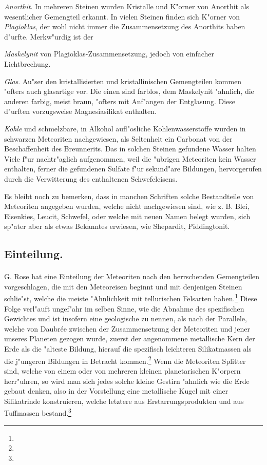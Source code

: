 \documentclass[a4paper, 11pt, oneside, polutonikogreek, german]{article}
\begin{document}
\emph{Anorthit}. In mehreren Steinen wurden Kristalle und K"orner von Anorthit als wesentlicher Gemengteil erkannt. In vielen Steinen finden sich K"orner von \emph{Plagioklas}, der wohl nicht immer die Zusammensetzung des Anorthits haben d"urfte. Merkw"urdig ist der

\emph{Maskelynit} von Plagioklas-Zusammensetzung, jedoch von einfacher Lichtbrechung.

\emph{Glas}. Au"ser den kristallisierten und kristallinischen Gemengteilen kommen "ofters auch glasartige vor. Die einen sind farblos, dem Maskelynit "ahnlich, die anderen farbig, meist braun, "ofters mit Anf"angen der Entglasung. Diese d"urften vorzugsweise Magnesiasilikat enthalten.

\emph{Kohle} und schmelzbare, in Alkohol aufl"osliche Kohlenwasserstoffe wurden in schwarzen Meteoriten nachgewiesen, als Seltenheit ein Carbonat von der Beschaffenheit des Breunnerits. Das in solchen Steinen gefundene Wasser halten Viele f"ur nachtr"aglich aufgenommen, weil die "ubrigen Meteoriten kein Wasser enthalten, ferner die gefundenen Sulfate f"ur sekund"are Bildungen, hervorgerufen durch die Verwitterung des enthaltenen Schwefeleisens.

Es bleibt noch zu bemerken, dass in manchen Schriften solche Bestandteile von Meteoriten angegeben wurden, welche nicht nachgewiesen sind, wie z. B. Blei, Eisenkies, Leucit, Schwefel, oder welche mit neuen Namen belegt wurden, sich sp"ater aber als etwas Bekanntes erwiesen, wie Shepardit, Piddingtonit.

\subsection{Einteilung.}
\paragraph*{}
G. Rose hat eine Einteilung der Meteoriten nach den herrschenden Gemengteilen vorgeschlagen, die mit den Meteoreisen beginnt und mit denjenigen Steinen schlie"st, welche die meiste "Ahnlichkeit mit tellurischen Felsarten haben.\footnote{} Diese Folge verl"auft ungef"ahr im selben Sinne, wie die Abnahme des spezifischen Gewichtes und ist insofern eine geologische zu nennen, als nach der Parallele, welche von Daubrée zwischen der Zusammensetzung der Meteoriten und jener unseres Planeten gezogen wurde, zuerst der angenommene metallische Kern der Erde als die "alteste Bildung, hierauf die spezifisch leichteren Silikatmassen als die j"ungeren Bildungen in Betracht kommen.\footnote{} Wenn die Meteoriten Splitter sind, welche von einem oder von mehreren kleinen planetarischen K"orpern herr"uhren, so wird man sich jedes solche kleine Gestirn "ahnlich wie die Erde gebaut denken, also in der Vorstellung eine metallische Kugel mit einer Silikatrinde konstruieren, welche letztere aus Erstarrungsprodukten und aus Tuffmassen bestand.\footnote{}
\end{document}
